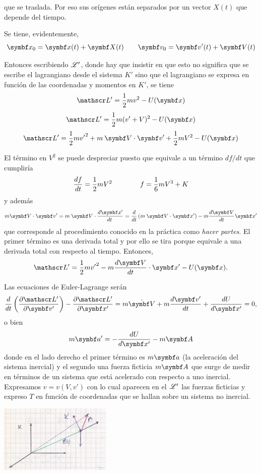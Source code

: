 \documentclass[10pt,oneside]{CBFT_book}
\begin{document}
que se traslada. Por eso sus orígenes están separados por un vector $X(t)$ que depende del tiempo.

Se tiene, evidentemente,
\[
	\vb{x}_0 = \vb{x}(t) + \vb{X}(t) \qquad \vb{v}_0 = \vb{v}'(t) + \vb{V}(t)
\]

Entonces escribiendo $\mathscr{L}'$, donde hay que insistir en que esto no significa que se escribe el
lagrangiano desde el sistema $K'$ sino que el lagrangiano se expresa en función de las coordenadas
y momentos en $K'$, se tiene 
\[
	\Lag' = \frac{1}{2} m v^2 - U(\vb{x})
\]
\[
	\Lag' = \frac{1}{2} m ( v' + V )^2 - U(\vb{x})
\]
\[
	\Lag' = \frac{1}{2} m {v'}^2 + m \: \vb{V}\cdot\vb{v}' + \frac{1}{2} m V^2 - U(\vb{x}) 
\]

El término en $V^2$ se puede despreciar puesto que equivale a un término $df/dt$ que cumpliría
\[
	\frac{d^{\hspace{-0.05em}} {f}}{d {t}^{\hspace{-0.05em}}} = \frac{1}{2} m V^2 \qquad \qquad f = \frac{1}{6} m V^3 + K
\]
y además 
\[
	 m \vb{V}\cdot\vb{v}' =  m \: \vb{V} \cdot\dtot{\vb{x}'}{t\phantom{'}} = 
	 \frac{d}{dt}\left( m \: \vb{V} \cdot \vb{x}' \right) - m \dtot{ \vb{V} }{t} \vb{x}' 
\]
que corresponde al procedimiento conocido en la práctica como {\it hacer partes}.
El primer término es una derivada total y por ello se tira porque equivale a una derivada total con 
respecto al tiempo. Entonces,
\[
	\Lag' = \frac{1}{2} m {v'}^2 - m \dtot{\vb{V}}{t}\cdot\vb{x}' - U(\vb{x}).
\]

Las ecuaciones de Euler-Lagrange serán 
\[
	\dtot{}{t} \left( \dpar{\Lag'}{\vb{v}'} \right) - \dpar{\Lag'}{\vb{x}'} =
		m \dot{ \vb{V} } + m \dtot{\vb{v}'}{t} + \dtot{U}{\vb{x}'} = 0,
\]
o bien
\[
	m \vb{a}' = -\dtot{U}{\vb{x}'} - m \vb{A}
\]
donde en el lado derecho el primer término es $m\vb{a}$ (la aceleración del sistema inercial) y el segundo una fuerza
ficticia $m\vb{A}$ que surge de medir en términos de un sistema que está acelerado con respecto a uno inercial.
Expresamos $v=v(V,v')$ con lo cual aparecen en el $\mathscr{L}'$ las fuerzas ficticias y expreso $T$ en 
función de coordenadas que se hallan sobre un sistema no inercial.

\includegraphics[width=0.4\textwidth]{images/fig_mc_no_inercial_ejemplo_2.jpg}
\end{document}
